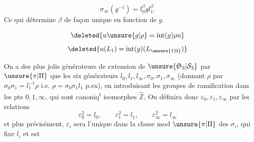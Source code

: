 \[
\sigma_\infty(g^{-1})=l_0^\beta g l_1^\beta.
\]
Ce qui détermine $\beta$ de façon unique en fonction de $g$.

\[
\deleted{\displaystyle u\unsure{g|\rho}=\operatorname{int}(g)\rho u}
\]
\[
\deleted{\displaystyle u(L_1)=\operatorname{int}(g)(L_{\unsure{1|0}})}
\]

On a des plus jolis générateurs de  extension de $\unsure{\mathfrak S_3|\mathcal S_3}$ par $\unsure{\pi|\Pi}$  que les six générateurs $l_0,l_1,l_\infty,\sigma_0,\sigma_1,\sigma_\infty$ (donnant $\rho$ par $\sigma_0\sigma_1=l_1^{-1}\rho$  i.e. $\rho=\sigma_0\sigma_1l_1$ p.ex), en introduisant les groupes de ramification dans les pts $0,1,\infty$, qui sont canoniq\textsuperscript{t} isomorphes  $\widehat{\mathbb Z}$,
On définira donc $\varepsilon_0,\varepsilon_1,\varepsilon_\infty$ par les relations
\[
\varepsilon_0^2=l_0,\qquad\varepsilon_1^2=l_1,\qquad\varepsilon_\infty^2=l_\infty
\]
et plus précisément, $\varepsilon_i$ sera l'unique   dans la classe mod $\unsure{\pi|\Pi}$ des $\sigma_i$,  qui fixe $l_i$ et est  
